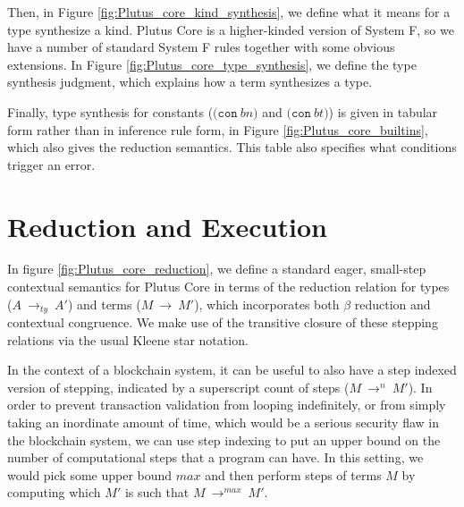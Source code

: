 \documentclass[conference]{IEEEtran}
\newcommand{\keyword}[1]{\texttt{#1}}
\newcommand{\construct}[1]{\texttt{(} #1 \texttt{)}}
\newcommand{\con}[1]{\construct{\keyword{con} ~ #1}}
\newcommand{\conT}[1]{\construct{\keyword{con} ~ #1}}
\newcommand{\typeStep}[2]{#1 ~ \rightarrow_{ty} ~ #2}
\newcommand{\step}[2]{#1 ~ \rightarrow ~ #2}
\newcommand{\multistepIndexed}[3]{#1 ~ \rightarrow^{#2} ~ #3}
\begin{document}
Then, in Figure \ref{fig:Plutus_core_kind_synthesis}, we define what it means for a type synthesize a kind. Plutus Core is a higher-kinded version of System F, so we have a number of standard System F rules together with some obvious extensions. In Figure \ref{fig:Plutus_core_type_synthesis}, we define the type synthesis judgment, which explains how a term synthesizes a type.

Finally, type synthesis for constants ($\con{bn}$ and $\conT{bt}$) is given in tabular form rather than in inference rule form, in Figure \ref{fig:Plutus_core_builtins}, which also gives the reduction semantics. This table also specifies what conditions trigger an error.
















\section{Reduction and Execution}

In figure \ref{fig:Plutus_core_reduction}, we define a standard eager, small-step contextual semantics for Plutus Core in terms of the reduction relation for types (\(\typeStep{A}{A'}\)) and terms (\(\step{M}{M'}\)), which incorporates both $\beta$ reduction and contextual congruence. We make use of the transitive closure of these stepping relations via the usual Kleene star notation.

In the context of a blockchain system, it can be useful to also have a step indexed version of stepping, indicated by a superscript count of steps (\(\multistepIndexed{M}{n}{M'}\)). In order to prevent transaction validation from looping indefinitely, or from simply taking an inordinate amount of time, which would be a serious security flaw in the blockchain system, we can use step indexing to put an upper bound on the number of computational steps that a program can have. In this setting, we would pick some upper bound $\mathit{max}$ and then perform steps of terms $M$ by computing which $M'$ is such that \(\multistepIndexed{M}{\mathit{max}}{M'}\).






\end{document}

